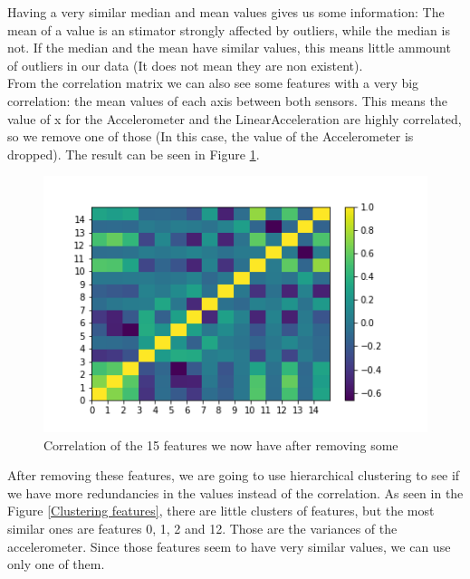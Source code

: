 \documentclass[idxtotoc,hyperref,openany]{labbook} %
\begin{document}
Having a very similar median and mean values gives us some information: The mean of a value is an stimator strongly affected by outliers, while the median is not. If the median and the mean have similar values, this means little ammount of outliers in our data (It does not mean they are non existent).\\

From the correlation matrix we can also see some features with a very big correlation: the mean values of each axis between both sensors. This means the value of x for the Accelerometer and the LinearAcceleration are highly correlated, so we remove one of those (In this case, the value of the Accelerometer is dropped). The result can be seen in Figure \ref{Correlation postdrop}.

\begin{figure}[h]
\includegraphics[width=0.9\linewidth]{Features_CorrelationMatrix_postDrop_Day1.png}
\setlength\belowcaptionskip{-10pt}
\caption{Correlation of the 15 features we now have after removing some}
\label{Correlation postdrop}
\end{figure}

After removing these features, we are going to use hierarchical clustering to see if we have more redundancies in the values instead of the correlation. As seen in the Figure \ref{Clustering features}, there are little clusters of features, but the most similar ones are features 0, 1, 2 and 12. Those are the variances of the accelerometer. Since those features seem to have very similar values, we can use only one of them.
\end{document}
